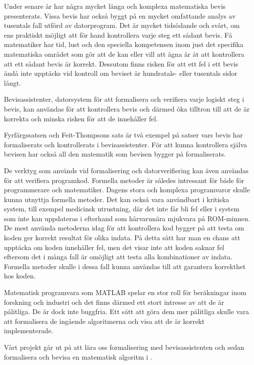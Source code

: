 Under senare år har några mycket långa och komplexa matematiska bevis
presenterats. Vissa bevis har också byggt på en mycket omfattande analys av
tusentals fall utförd av datorprogram. Det är mycket tidsödande och svårt, om
ens praktiskt möjligt att för hand kontrollera varje steg ett sådant bevis. Få
matematiker har tid, lust och den speciella kompetensen inom just det specifika
matematiska området som gör att de kan eller vill att ägna år åt att
kontrollera att ett sådant bevis är korrekt. Dessutom finns risken för att ett
fel i ett bevis ändå inte upptäcks vid kontroll om beviset är hundratals- eller
tusentals sidor långt.\cite{harrison2008formal}

Bevisassistenter, datorsystem för att formalisera och verifiera varje logiskt
steg i bevis, kan användas för att kontrollera bevis och därmed öka tilltron
till att de är korrekta och minska risken för att de innehåller fel.

Fyrfärgssatsen\cite{gonthier2008formal} och Feit-Thompsons
sats\cite{aschbacher2004status} är två exempel på satser vars bevis har
formaliserats och kontrollerats i bevisassistenter. För att kunna kontrollera
själva bevisen har också all den matematik som bevisen bygger på formaliserats.

De verktyg som används vid formalisering och datorverifiering kan även användas
för att verifiera programkod. Formella metoder är således intressant för både
för programmerare och matematiker.
Dagens stora och komplexa programvaror skulle kunna utnyttja formella metoder.
Det kan också vara användbart i
kritiska system, till exempel medicinsk utrustning,  där det inte får bli fel
eller i system som inte kan uppdateras i efterhand som hårvarunära mjukvara
på ROM-minnen. De mest använda metoderna idag för
att kontrollera kod bygger på att testa om koden ger korrekt resultat för olika
indata. På detta sätt har man en chans att upptäcka om koden innehåller fel,
men det visar inte att koden saknar fel eftersom det i många fall är omöjligt
att testa alla kombinationer av indata.
Formella metoder skulle i dessa fall
kunna användas till att garantera korrekthet hos koden.

Matematisk programvara som MATLAB spelar en stor roll för beräkningar inom
forskning och industri och det finns därmed ett stort intresse av att de är
pålitliga. De är dock inte buggfria. Ett sätt att göra dem mer pålitliga skulle
vara att formalisera de ingående algoritmerna och visa att de är korrekt
implementerade\cite{denes2012refinement}.

Vårt projekt går ut på att lära oss formalisering med bevisassistenten \coq och
sedan formalisera och bevisa en matematisk algoritm i \coq.
